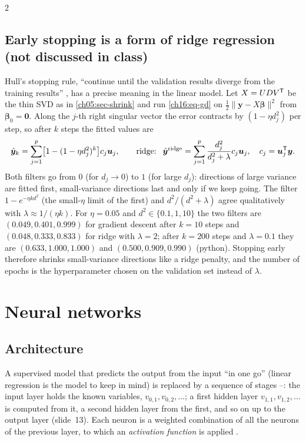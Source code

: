 \begin{paracol}{2}
\subsection{Early stopping is a form of ridge regression (not discussed in class)}
Hull's stopping rule, ``continue until the validation results diverge from the training results'' , has a precise meaning in the linear model. Let $X=UDV^{\mathsf T}$ be the thin SVD as in \cref{ch05:sec-shrink}
and run \eqref{ch16:eq-gd} on $\tfrac12\|\bm y-X\bm\beta\|^2$ from $\bm\beta_0=\bm 0$. Along the $j$-th right singular vector the error contracts by $(1-\eta d_j^2)$ per step, so after $k$ steps the fitted values are
\[
  \hat{\bm y}_k=\sum_{j=1}^p\bigl[1-(1-\eta d_j^2)^k\bigr]c_j\bm u_j,\qquad\text{ridge: }\ \hat{\bm y}^{\text{ridge}}=\sum_{j=1}^p\frac{d_j^2}{d_j^2+\lambda}c_j\bm u_j,\quad c_j=\bm u_j^{\mathsf T}\bm y .
\]
Both filters go from $0$ (for $d_j\to0$) to $1$ (for large $d_j$): directions of large variance are fitted first, small-variance directions last and only if we keep going. The filter $1-e^{-\eta kd^2}$ (the small-$\eta$ limit of the first) and
$d^2/(d^2+\lambda)$ agree qualitatively with $\lambda\approx1/(\eta k)$. For $\eta=0.05$ and $d^2\in\{0.1,1,10\}$ the two filters are $(0.049,0.401,0.999)$ for gradient descent after $k=10$ steps and $(0.048,0.333,0.833)$ for ridge with
$\lambda=2$; after $k=200$ steps and $\lambda=0.1$ they are $(0.633,1.000,1.000)$ and $(0.500,0.909,0.990)$ (python). Stopping early therefore shrinks small-variance directions like a ridge penalty, and the number of epochs is the hyperparameter chosen on
the validation set instead of $\lambda$.

\section{Neural networks}\label{ch16:sec-nn}
\subsection{Architecture}
A supervised model that predicts the output from the input ``in one go'' (linear regression is the model to keep in mind) is replaced by a sequence of stages
--: the input layer holds the known variables, $v_{0,1},v_{0,2},\dots$; a first hidden layer $v_{1,1},v_{1,2},\dots$ is computed from it, a second hidden layer from the first, and so on up to the output layer (slide~13).
Each neuron is a weighted combination of all the neurons of the previous layer, to which an \emph{activation function} is applied .


\end{paracol}
